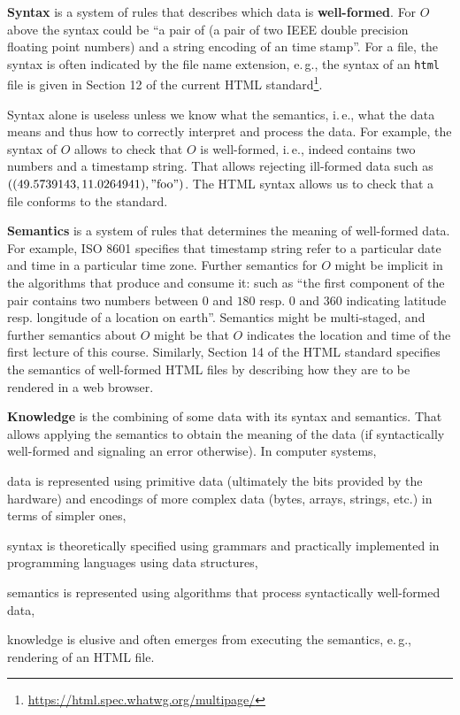\textbf{Syntax} is a system of rules that describes which data is \textbf{well-formed}.
For $O$ above the syntax could be \enquote{a pair of (a pair of two IEEE double precision floating point numbers) and a string encoding of an time stamp}. 
For a file, the syntax is often indicated by the file name extension, e.\,g., the syntax of an \texttt{html} file is given in Section 12 of the current HTML standard\footnote{\url{https://html.spec.whatwg.org/multipage/}}.

Syntax alone is useless unless we know what the semantics, i.\,e., what the data means and thus how to correctly interpret and process the data.
For example, the syntax of $O$ allows to check that $O$ is well-formed, i.\,e., indeed contains two numbers and a timestamp string.
That allows rejecting ill-formed data such as $((49.5739143, 11.0264941), "\text{foo}")$.
The HTML syntax allows us to check that a file conforms to the standard.

\textbf{Semantics} is a system of rules that determines the meaning of well-formed data.
For example, ISO 8601 specifies that timestamp string refer to a particular date and time in a particular time zone.
Further semantics for $O$ might be implicit in the algorithms that produce and consume it: such as \enquote{the first component of the pair contains two numbers between $0$ and $180$ resp. $0$ and $360$ indicating latitude resp. longitude of a location on earth}.
Semantics might be multi-staged, and further semantics about $O$ might be that $O$ indicates the location and time of the first lecture of this course.
Similarly, Section 14 of the HTML standard specifies the semantics of well-formed HTML files by describing how they are to be rendered in a web browser.

\textbf{Knowledge} is the combining of some data with its syntax and semantics.
That allows applying the semantics to obtain the meaning of the data (if syntactically well-formed and signaling an error otherwise).
In computer systems,
\begin{compactitem}
 \item data is represented using primitive data (ultimately the bits provided by the hardware) and encodings of more complex data (bytes, arrays, strings, etc.) in terms of simpler ones,
 \item syntax is theoretically specified using grammars and practically implemented in programming languages using data structures,
 \item semantics is represented using algorithms that process syntactically well-formed data,
 \item knowledge is elusive and often emerges from executing the semantics, e.\,g., rendering of an HTML file.
\end{compactitem}

